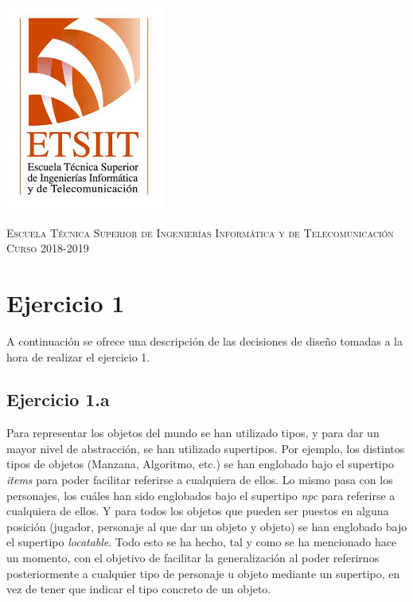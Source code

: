 \documentclass[11pt,a4paper]{article}
\begin{document}
\begin{titlepage}
\begin{minipage}{\textwidth}
\includegraphics[scale=0.3]{img/etsiit.jpeg}

\vspace{0.7cm}
\textsc{Escuela Técnica Superior de Ingenierías Informática y de Telecomunicación}\\
\vspace{1cm}
\textsc{Curso 2018-2019}
\end{minipage}
\end{titlepage}

\tableofcontents
\thispagestyle{empty}				%

\newpage

\setlength{\parskip}{1em}

\section{Ejercicio 1}

A continuación se ofrece una descripción de las decisiones de diseño tomadas a la hora de realizar el ejercicio 1.

\subsection{Ejercicio 1.a}

Para representar los objetos del mundo se han utilizado tipos, y para dar un mayor nivel de abstracción, se han utilizado supertipos.
Por ejemplo, los distintos tipos de objetos (Manzana, Algoritmo, etc.) se han englobado bajo el supertipo \textit{items} para
poder facilitar referirse a cualquiera de ellos. Lo mismo pasa con los personajes, los cuáles han sido englobados bajo el supertipo
\textit{npc} para referirse a cualquiera de ellos. Y para todos los objetos que pueden ser puestos en alguna posición (jugador,
personaje al que dar un objeto y objeto) se han englobado bajo el supertipo \textit{locatable}. Todo esto se ha hecho, tal y como
se ha mencionado hace un momento, con el objetivo de facilitar la generalización al poder referirnos posteriormente a cualquier tipo
de personaje u objeto mediante un supertipo, en vez de tener que indicar el tipo concreto de un objeto.
\end{document}
